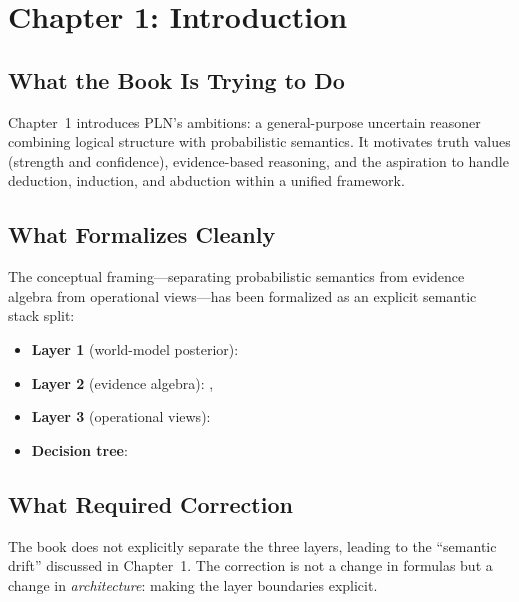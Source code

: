 \documentclass[11pt,openany]{report}
\begin{document}

\chapter{Chapter 1: Introduction}
\label{ch:review-ch1}

\section{What the Book Is Trying to Do}

Chapter~1 introduces PLN's ambitions: a general-purpose uncertain reasoner
combining logical structure with probabilistic semantics.  It motivates
truth values (strength and confidence), evidence-based reasoning, and the
aspiration to handle deduction, induction, and abduction within a unified
framework.

\section{What Formalizes Cleanly}

The conceptual framing---separating probabilistic semantics from evidence
algebra from operational views---has been formalized as an explicit semantic
stack split:

\begin{itemize}
\item \textbf{Layer 1} (world-model posterior): 
\item \textbf{Layer 2} (evidence algebra): ,
\item \textbf{Layer 3} (operational views): 
\item \textbf{Decision tree}: 
\end{itemize}

\section{What Required Correction}

The book does not explicitly separate the three layers, leading to the
``semantic drift'' discussed in \xiPLN{} Chapter~1.  The correction is
not a change in formulas but a change in \emph{architecture}: making the
layer boundaries explicit.
\end{document}

